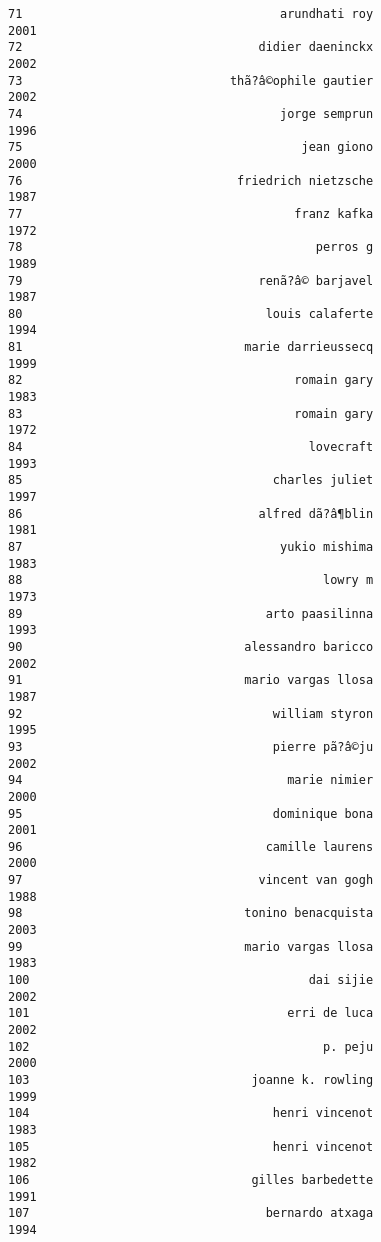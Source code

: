 \documentclass[
]{report}
\begin{document}
\begin{verbatim}
71                                    arundhati roy                2001
72                                 didier daeninckx                2002
73                             thã?â©ophile gautier                2002
74                                    jorge semprun                1996
75                                       jean giono                2000
76                              friedrich nietzsche                1987
77                                      franz kafka                1972
78                                         perros g                1989
79                                 renã?â© barjavel                1987
80                                  louis calaferte                1994
81                               marie darrieussecq                1999
82                                      romain gary                1983
83                                      romain gary                1972
84                                        lovecraft                1993
85                                   charles juliet                1997
86                                 alfred dã?â¶blin                1981
87                                    yukio mishima                1983
88                                          lowry m                1973
89                                  arto paasilinna                1993
90                               alessandro baricco                2002
91                               mario vargas llosa                1987
92                                   william styron                1995
93                                   pierre pã?â©ju                2002
94                                     marie nimier                2000
95                                   dominique bona                2001
96                                  camille laurens                2000
97                                 vincent van gogh                1988
98                               tonino benacquista                2003
99                               mario vargas llosa                1983
100                                       dai sijie                2002
101                                    erri de luca                2002
102                                         p. peju                2000
103                               joanne k. rowling                1999
104                                  henri vincenot                1983
105                                  henri vincenot                1982
106                               gilles barbedette                1991
107                                 bernardo atxaga                1994

\end{verbatim}
\end{document}
